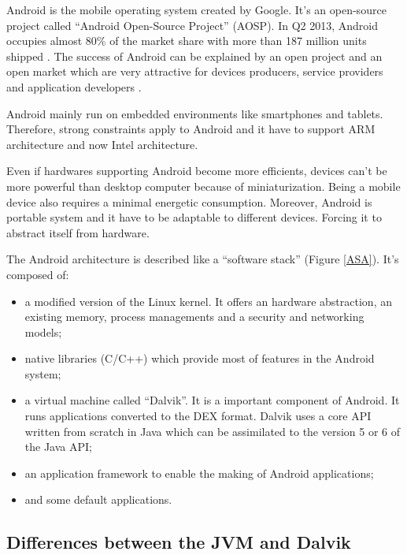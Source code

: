 \documentclass{sig-alternate}
\def \DALVIK{Dalvik\xspace}
\def \ANDROID{Android\xspace}
\def \DEX{DEX\xspace}
\begin{document}
    \ANDROID is the mobile operating system created by Google.
    It's an open-source project called ``\ANDROID Open-Source Project'' (AOSP).
    In Q2 2013, \ANDROID occupies almost 80\% of the market share with more than 187 million units shipped \cite{idc-website}.
    The success of \ANDROID can be explained by an open project and an open market
    which are very attractive for devices producers, service providers and application developers \cite{ieee-butler-android-landscape}.

    \ANDROID mainly run on embedded environments like smartphones and tablets.
    Therefore, strong constraints apply to \ANDROID
    and it have to support ARM architecture and now Intel architecture.
    
    Even if hardwares supporting \ANDROID become more efficients,
    devices can't be more powerful than desktop computer because of miniaturization.
    Being a mobile device also requires a minimal energetic consumption.
    Moreover, \ANDROID is portable system and it have to be adaptable to different devices.
    Forcing it to abstract itself from hardware.

    The \ANDROID architecture is described like a ``software stack'' (Figure \ref{ASA}).
    It's composed of:
    \begin{itemize}
      \item a modified version of the Linux kernel.
        It offers an hardware abstraction, an existing memory, process managements and a security and networking models;
      \item native libraries (C/C++)
        which provide most of features in the \ANDROID system;
      \item a virtual machine called ``\DALVIK''.
        It is a important component of \ANDROID.
        It runs applications converted to the \DEX format.
        \DALVIK uses a core API written from scratch in Java
        which can be assimilated to the version 5 or 6 of the Java API;
      \item an application framework to enable the making of \ANDROID applications;
      \item and some default applications.
    \end{itemize}

    \subsection{Differences between the JVM and \DALVIK}
\end{document}
